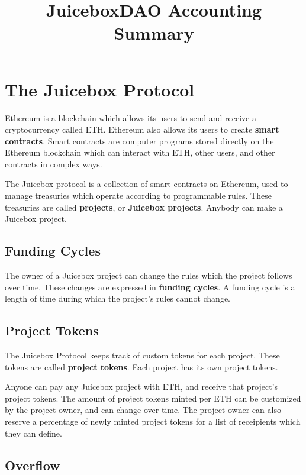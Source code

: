 \documentclass{article}
\title{JuiceboxDAO Accounting Summary}
\begin{document}
\maketitle

\section{The Juicebox Protocol}

Ethereum is a blockchain which allows its users to send and receive a cryptocurrency called ETH. Ethereum also allows its users to create \textbf{smart contracts}. Smart contracts are computer programs stored directly on the Ethereum blockchain which can interact with ETH, other users, and other contracts in complex ways.

The Juicebox protocol is a collection of smart contracts on Ethereum, used to manage treasuries which operate according to programmable rules. These treasuries are called \textbf{projects}, or \textbf{Juicebox projects}. Anybody can make a Juicebox project.

\subsection{Funding Cycles}

The owner of a Juicebox project can change the rules which the project follows over time. These changes are expressed in \textbf{funding cycles}. A funding cycle is a length of time during which the project's rules cannot change.

\subsection{Project Tokens}

The Juicebox Protocol keeps track of custom tokens for each project. These tokens are called \textbf{project tokens}. Each project has its own project tokens.

Anyone can pay any Juicebox project with ETH, and receive that project's project tokens. The amount of project tokens minted per ETH can be customized by the project owner, and can change over time. The project owner can also reserve a percentage of newly minted project tokens for a list of receipients which they can define.

\subsection{Overflow}
\end{document}
